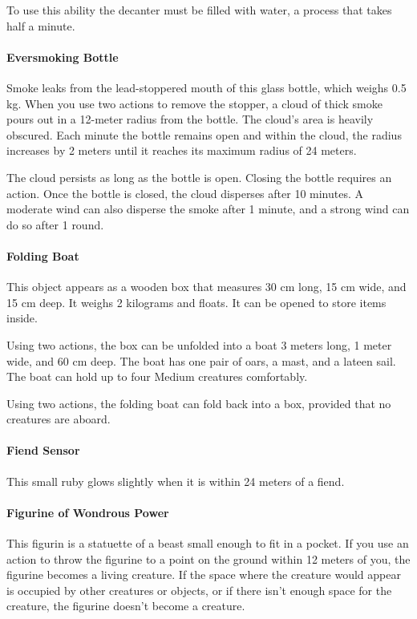         To use this ability the decanter must be filled with water, a process that takes half a minute.
    \paragraph{Eversmoking Bottle}
        Smoke leaks from the lead-stoppered mouth of this glass bottle, which weighs 0.5 kg.
        When you use two actions to remove the stopper, a cloud of thick smoke pours out in a 12-meter radius from the bottle.
        The cloud's area is heavily obscured.
        Each minute the bottle remains open and within the cloud, the radius increases by 2 meters until it reaches its maximum radius of 24 meters.

        The cloud persists as long as the bottle is open.
        Closing the bottle requires an action.
        Once the bottle is closed, the cloud disperses after 10 minutes.
        A moderate wind can also disperse the smoke after 1 minute, and a strong wind can do so after 1 round.
    \paragraph{Folding Boat}
        This object appears as a wooden box that measures 30 cm long, 15 cm wide, and 15 cm deep.
        It weighs 2 kilograms and floats.
        It can be opened to store items inside.

        Using two actions, the box can be unfolded into a boat 3 meters long, 1 meter wide, and 60 cm deep.
        The boat has one pair of oars, a mast, and a lateen sail.
        The boat can hold up to four Medium creatures comfortably.

        Using two actions, the folding boat can fold back into a box, provided that no creatures are aboard.
    \paragraph{Fiend Sensor}
        This small ruby glows slightly when it is within 24 meters of a fiend.
    \paragraph{Figurine of Wondrous Power}
        This figurin is a statuette of a beast small enough to fit in a pocket.
        If you use an action to throw the figurine to a point on the ground within 12 meters of you, the figurine becomes a living creature.
        If the space where the creature would appear is occupied by other creatures or objects, or if there isn't enough space for the creature, the figurine doesn't become a creature.

